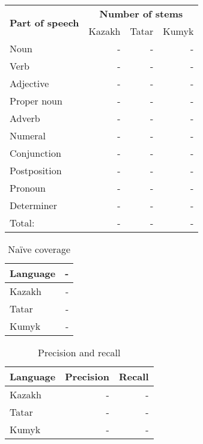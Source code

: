 \documentclass[a4paper,11pt,twocolumn]{article}
\begin{document}
\begin{table}
\begin{center}
\begin{tabular}{lrrr}
		\hline
\multirow{2}{*}{\textbf{Part of speech}} & \multicolumn{3}{|c|}{\textbf{Number of stems}} \\
                        & Kazakh & Tatar & Kumyk \\
		\hline
		Noun & - & - & - \\
		Verb & - & - & - \\
		Adjective & - & - & - \\
		Proper noun & - & - & - \\
		Adverb & - & - & - \\
		Numeral & - & - & - \\
		Conjunction & - & - & - \\
		Postposition & - & - & - \\
		Pronoun & - & - & - \\
		Determiner & - & - & - \\
		\hline
		Total: & - & - & - \\
		\hline
\end{tabular}
\end{center}

\end{table}

\begin{table}
\begin{center}
\begin{tabular}{lr}
\textbf{Language} & - \\
\hline
Kazakh & - \\
Tatar & - \\
Kumyk & - \\
\hline
\end{tabular}
 \caption{Naïve coverage}
 \label{table:coverage}
\end{center}
\end{table}

\begin{table}
\begin{center}
\begin{tabular}{lrr}
\textbf{Language} & \textbf{Precision} & \textbf{Recall} \\
\hline
Kazakh & - &  - \\
Tatar & - & - \\
Kumyk & - & - \\
\hline
\end{tabular}
 \caption{Precision and recall}
 \label{table:coverage}
\end{center}
\end{table}
\end{document}
